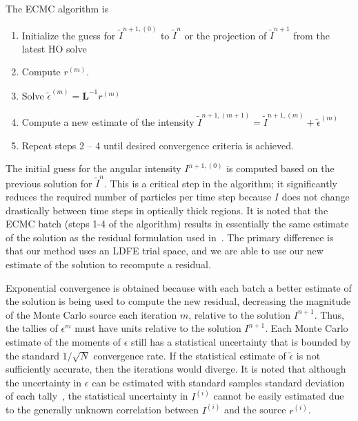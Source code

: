 \documentclass{mc2013}
\newcommand{\B}[1]{\ensuremath{\mathbf{#1}}}
\begin{document}
The ECMC algorithm is
\begin{enumerate}
    \item Initialize the guess for $\tilde{I}^{n+1,(0)}$ to $\tilde{I}^{n}$ or the
        projection of $\tilde{I}^{n+1}$ from the latest HO solve
\item Compute $r^{(m)}$.
\item Solve $\tilde{\epsilon}^{(m)} = \B L^{-1} r^{(m)}$
\item Compute a new estimate of the intensity $\tilde I^{n+1,(m+1)} = \tilde I^{n+1,(m)}
+ \tilde\epsilon^{(m)}$
\item Repeat steps 2 -- 4 until desired convergence criteria is achieved. 
\end{enumerate}
The initial guess for the angular intensity $I^{n+1,(0)}$ is computed based on the previous solution
for $\tilde{I}^{n}$. This is a critical step in the algorithm; it significantly reduces the required number of
particles per time step because $I$ does not change drastically between time steps in
optically thick regions.  It is noted that the ECMC batch (steps 1-4 of the
algorithm) results in essentially the same estimate of the solution as the residual
formulation used in~\cite{rmc}.  The primary difference is that our method uses an LDFE trial
space, and we are able to use our new estimate of the solution to recompute a
residual.

Exponential convergence is obtained because with each batch a
better estimate of the solution is being used to compute the new residual, decreasing
the magnitude of the Monte Carlo source each iteration $m$, relative to the solution
$I^{n+1}$. Thus, the tallies of $\epsilon^{m}$ must have units relative to the solution
$I^{n+1}$.  Each Monte Carlo
estimate of the moments of $\epsilon$ still has a statistical uncertainty that is
bounded by the standard $1/\sqrt{N}$ convergence rate.  If the statistical estimate of $\tilde\epsilon$ is not sufficiently
accurate, then the iterations would diverge. It is noted that although the
uncertainty in $\epsilon$ can be estimated with standard samples standard deviation
of each tally~\cite{shultis_mc}, the statistical uncertainty in $I^{(i)}$ cannot be easily
estimated due to the generally unknown correlation between $I^{(i)}$ and the source
$r^{(i)}$.
\end{document}
